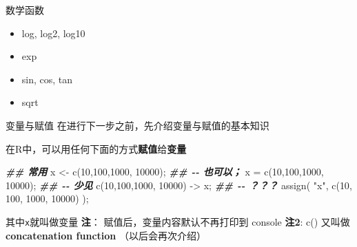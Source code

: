 \documentclass[ignorenonframetext,]{beamer}
\newenvironment{Shaded}{\begin{snugshade}}{\end{snugshade}}
\newcommand{\DecValTok}[1]{\textcolor[rgb]{0.00,0.00,0.81}{#1}}
\newcommand{\DocumentationTok}[1]{\textcolor[rgb]{0.56,0.35,0.01}{\textbf{\textit{#1}}}}
\newcommand{\FunctionTok}[1]{\textcolor[rgb]{0.00,0.00,0.00}{#1}}
\newcommand{\NormalTok}[1]{#1}
\newcommand{\OtherTok}[1]{\textcolor[rgb]{0.56,0.35,0.01}{#1}}
\newcommand{\StringTok}[1]{\textcolor[rgb]{0.31,0.60,0.02}{#1}}
\providecommand{\tightlist}{%
  \setlength{\itemsep}{0pt}\setlength{\parskip}{0pt}}
\newcommand\FontSmall{\fontsize{7}{8}\selectfont}
\newcommand\FontNormal{\fontsize{10}{10}\selectfont}
\begin{document}
\begin{frame}{数学函数}
\protect\hypertarget{ux6570ux5b66ux51fdux6570}{}
\begin{itemize}
\tightlist
\item
  log, log2, log10
\item
  exp
\item
  sin, cos, tan
\item
  sqrt
\end{itemize}
\end{frame}

\begin{frame}[fragile]{变量与赋值}
\protect\hypertarget{ux53d8ux91cfux4e0eux8d4bux503c}{}
在进行下一步之前，先介绍变量与赋值的基本知识

在R中，可以用任何下面的方式\textbf{赋值}给\textbf{变量}

\FontSmall

\begin{Shaded}
\begin{Highlighting}[]
\DocumentationTok{\#\# 常用}
\NormalTok{x }\OtherTok{\textless{}{-}} \FunctionTok{c}\NormalTok{(}\DecValTok{10}\NormalTok{,}\DecValTok{100}\NormalTok{,}\DecValTok{1000}\NormalTok{, }\DecValTok{10000}\NormalTok{);}
\DocumentationTok{\#\# {-}{-} 也可以； }
\NormalTok{x }\OtherTok{=} \FunctionTok{c}\NormalTok{(}\DecValTok{10}\NormalTok{,}\DecValTok{100}\NormalTok{,}\DecValTok{1000}\NormalTok{, }\DecValTok{10000}\NormalTok{);}
\DocumentationTok{\#\# {-}{-} 少见}
\FunctionTok{c}\NormalTok{(}\DecValTok{10}\NormalTok{,}\DecValTok{100}\NormalTok{,}\DecValTok{1000}\NormalTok{, }\DecValTok{10000}\NormalTok{) }\OtherTok{{-}\textgreater{}}\NormalTok{ x;}
\DocumentationTok{\#\# {-}{-} ？？？ }
\FunctionTok{assign}\NormalTok{( }\StringTok{"x"}\NormalTok{, }\FunctionTok{c}\NormalTok{(}\DecValTok{10}\NormalTok{, }\DecValTok{100}\NormalTok{, }\DecValTok{1000}\NormalTok{, }\DecValTok{10000}\NormalTok{) );}
\end{Highlighting}
\end{Shaded}

\FontNormal

其中\texttt{x}就叫做变量 \textbf{注}： 赋值后，变量内容默认不再打印到
console \textbf{注2}: c() 又叫做 \textbf{concatenation function}
（以后会再次介绍）
\end{frame}
\end{document}
